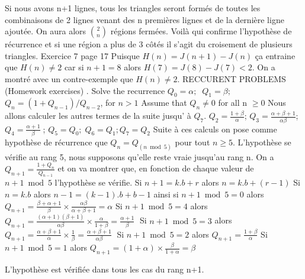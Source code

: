 \documentclass[9pt]{amsart}
\begin{document}
Si nous avons n+1 lignes, tous les triangles seront form\'{e}s de toutes les combinaisons de 2 lignes 
venant des n premi\`{e}res lignes et de la derni\`{e}re ligne ajout\'{e}e. 
On aura alors $\binom{2}{n}$ r\'{e}gions ferm\'{e}es. Voil\`{a} qui confirme l'hypoth\`{e}se de r\'{e}currence et si une r\'{e}gion a plus de 3 côt\'{e}s
il s'agit du croisement de plusieurs triangles. 
 \newline\newline
Exercice 7 page 17 \newline
Puisque $H(n) = J(n+1) - J(n)$ ça entraine que $H(n) \neq 2$ car si $n+1 = 8$ alors $H(7) = J(8) - J(7) < 2$.\newline
On a montr\'{e} avec un contre-exemple que  $H(n) \neq 2$.
\newline\newline
RECCURENT PROBLEMS (Homework exercises)
\newline{}. Solve the recurrence 
$Q_{0} = \alpha; \;\; Q_{1}= \beta;$\newline 
$Q_{n} = (1 + Q_{n-1}) / Q_{n-2}$, for $n > 1$
\newline Assume that $Q_{n}  \neq 0$ for all n $\geq 0$\newline\newline
Nous allons calculer les autres termes de la suite jusqu' \`{a} $Q_{7}$.\newline
$Q_{2} = \frac{1+\beta}{\alpha}$;\; $Q_{3} = \frac{\alpha+\beta+1}{\alpha\beta}$;\; $Q_{4}=\frac{\alpha+1}{\beta}\;$; $Q_{5}= Q_{0};\; Q_{6} = Q_{1}; Q_{7} = Q_{2}$ 
\newline\newline Suite \`{a} ces calculs on pose comme hypoth\`{e}se de r\'{e}currence que $Q_{n} = Q_{(n\bmod5)}$ pour tout $n \geq 5$. L'hypoth\`{e}se se v\'{e}rifie au rang 5, nous supposons qu'elle reste vraie jusqu'au rang n. On a $Q_{n+1} = \frac{1 + Q_{n}}{Q_{n-1}}$ et on va montrer que, en fonction de chaque valeur de $n+1\bmod5$ l'hypoth\`{e}se se v\'{e}rifie. \newline\newline
Si $n+1 = k.b + r$ alors $n = k.b + (r-1)$ \newline
Si $n = k.b$ alors $n-1 = (k-1).b + b - 1$\newline
ainsi si $n+1 \bmod 5 = 0$ alors $Q_{n+1} = \frac{\beta+\alpha+1}{\beta}\times\frac{\alpha\beta}{\alpha+\beta+1} = \alpha$\newline
Si $n+1 \bmod 5 = 4$ alors $Q_{n+1} = \frac{(\alpha+1)(\beta+1)}{\alpha\beta}\times\frac{\alpha}{1 + \beta} = \frac{\alpha+1}{\beta}\;$\newline
Si $n+1 \bmod 5 = 3$ alors  $Q_{n+1} = \frac{\alpha+\beta+1}{\alpha}\times\frac{1}{\beta} = \frac{\alpha+\beta+1}{\alpha\beta}\;$\newline
Si $n+1 \bmod 5 = 2$ alors  $Q_{n+1} = \frac{1+\beta}{\alpha}$\newline
Si $n+1 \bmod 5 = 1$ alors  $Q_{n+1} = (1 + \alpha)\times\frac{\beta}{1+\alpha} = \beta$\newline\newline

L'hypoth\`{e}se est v\'{e}rifi\'{e}e dans tous les cas du rang n+1.
\end{document}
